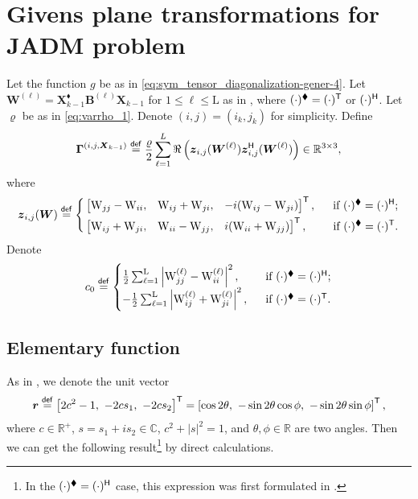 \documentclass[final,onefignum,onetabnum]{siamart190516}
\newcommand{\matr}[1]{\boldsymbol{#1}}
\newcommand{\vect}[1]{\boldsymbol{#1}}
\newcommand{\T}{{\sf T}} %
\renewcommand{\H}{{\sf H}} %
\newcommand{\eqdef}{\stackrel{\sf def}{=}}
\newcommand{\RR}{\mathbb{R}}
\newcommand{\CC}{\mathbb{C}}
\newcommand{\R}{\Re}
\newcommand{\Gamij}[3]{\matr{\Gamma}^{(#1,#2,#3)}}
\newcommand{\matrelem}[1]{\mathrm{#1}}
\renewcommand{\H}{{\sf H}}      %
\renewcommand{\TH}{{\blacklozenge}}
\newcommand{\ui}{i}
\begin{document}
\section{Givens plane transformations for JADM problem}\label{sec:trian_diago_rotation-2}

Let the function $g$ be as in \cref{eq:sym_tensor_diagonalization-gener-4}.
Let $\matr{W}^{(\ell)}=\matr{X}_{k-1}^{\TH}\matr{B}^{(\ell)} \matr{X}_{k-1}$ for $1\leq\ell\leq \matrelem{L}$ as in , where $(\cdot)^{\TH}=(\cdot)^{\T}$ or $(\cdot)^{\H}$. 
Let $\varrho$ be as in \cref{eq:varrho_1}. 
Denote $(i,j)=(i_k,j_k)$ for simplicity. 
Define 
\begin{align}\label{eq:gamma_matr_ij}
\Gamij{i}{j}{\matr{X}_{k-1}}\eqdef
\frac{\varrho}{2}\sum\limits_{\ell=1}^{L}   \R\left(\vect{z}_{i,j}(\matr{W}^{(\ell)}) \vect{z}_{i,j}^{\H}(\matr{W}^{(\ell)})\right)\in\RR^{3\times 3},
\end{align}
where
\begin{align*}
\vect{z}_{i,j}(\matr{W})\eqdef\left\{
\begin{aligned}
&\begin{bmatrix} \matrelem{W}_{jj}-\matrelem{W}_{ii}, & \matrelem{W}_{ij}+\matrelem{W}_{ji}, & -\ui (\matrelem{W}_{ij}-\matrelem{W}_{ji}) \end{bmatrix}^{\T},\ \  &\textrm{if}\  (\cdot)^{\TH}=(\cdot)^{\H}; \\
&\begin{bmatrix} \matrelem{W}_{ij}+\matrelem{W}_{ji}, & \matrelem{W}_{ii}-\matrelem{W}_{jj}, & \ui (\matrelem{W}_{ii}+\matrelem{W}_{jj}) \end{bmatrix}^{\T},\ \  &\textrm{if}\  (\cdot)^{\TH}=(\cdot)^{\T}.
\end{aligned}
\right.
\end{align*}
Denote 
\begin{align*}
c_0 \eqdef 
\begin{cases} \frac{1}{2}\sum_{\ell=1}^{\matrelem{L}} \left|\matrelem{W}^{(\ell)}_{jj}-\matrelem{W}^{(\ell)}_{ii}\right|^2,\ \  &\textrm{if}\  (\cdot)^{\TH}=(\cdot)^{\H}; \\  -\frac{1}{2}\sum_{\ell=1}^{\matrelem{L}} \left|\matrelem{W}^{(\ell)}_{ij}+\matrelem{W}^{(\ell)}_{ji}\right|^2,\ \  &\textrm{if}\  (\cdot)^{\TH}=(\cdot)^{\T}.
\end{cases} 
\end{align*}

\subsection{Elementary function}\label{subsec:eleme_func_H}
As in \cite[Eq. (4.4)]{ULC2019}, we denote the unit vector 
\begin{align}
\vect{r}  
\eqdef\left[2c^2-1,\ -2cs_1,\ -2cs_2\right]^{\T} 
= \left[\cos 2\theta,\ -\sin 2\theta\cos\phi,\  -\sin 2\theta\sin\phi\right]^{\T}, \label{eq:w_definition}
\end{align}
where $c\in \RR^{+}$, $s= s_1 + \ui s_2\in\CC$, $c^2+|s|^2 =1$, and $\theta,\phi\in\RR$ are two angles. 
Then we can get the following result\footnote{In the $(\cdot)^{\TH}=(\cdot)^{\H}$ case, this expression was first formulated in \cite{cardoso1996jacobi}.} by direct calculations.
\end{document}
